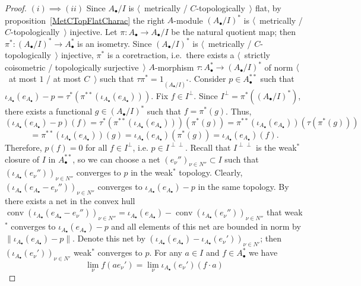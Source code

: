 \begin{proof} $(i)\implies (ii)$  Since $A_\bullet /I$ is $\langle$~metrically
/ $C$-topologically~$\rangle$ flat, by proposition~\ref{MetCTopFlatCharac} 
the right $A$-module ${(A_\bullet /I)}^*$ is $\langle$~metrically /
$C$-topologically~$\rangle$ injective. Let $\pi:A_\bullet \to A_\bullet /I$ be the
natural quotient map; then $\pi^*:{(A_\bullet /I)}^*\to A_\bullet ^*$ is an
isometry. Since ${(A_\bullet /I)}^*$ is $\langle$~metrically /
$C$-topologically~$\rangle$ injective, $\pi^*$ is a coretraction, i.e.\
there exists a $\langle$~strictly coisometric / topologically
surjective~$\rangle$ $A$-morphism $\tau:A_\bullet ^*\to {(A_\bullet /I)}^*$ of
norm $\langle$~at most $1$ / at most $C$~$\rangle$ such that
$\tau\pi^*=1_{{(A_\bullet /I)}^*}$. Consider $p\in A_\bullet ^{**}$ such that
$\iota_{A_\bullet }(e_{A_\bullet })-p
=\tau^*(\pi^{**}(\iota_{A_\bullet }(e_{A_\bullet })))$. 
Fix $f\in I^\perp$. Since $I^\perp=\pi^*({(A_\bullet /I)}^*)$, 
there exists a functional $g\in {(A_\bullet /I)}^*$ such 
that $f=\pi^*(g)$. Thus,
\[
(\iota_{A_\bullet }(e_{A_\bullet })-p)(f)
=\tau^*(\pi^{**}(\iota_{A_\bullet }(e_{A_\bullet })))(\pi^*(g))
=\pi^{**}(\iota_{A_\bullet }(e_{A_\bullet }))(\tau(\pi^*(g)))
\]
\[
=\pi^{**}(\iota_{A_\bullet }(e_{A_\bullet }))(g)
=\iota_{A_\bullet }(e_{A_\bullet })(\pi^*(g))
=\iota_{A_\bullet }(e_{A_\bullet })(f).
\]
Therefore, $p(f)=0$ for all $f\in I^\perp$, i.e. $p\in I^{\perp\perp}$. Recall
that $I^{\perp\perp}$ is the weak${}^*$ closure of $I$ in $A_\bullet ^{**}$, so we can
choose a net ${(e_\nu'')}_{\nu\in N''}\subset I$ such that
${(\iota_{A_\bullet }(e_\nu''))}_{\nu\in N''}$ converges to $p$ in the weak${}^*$ topology.
Clearly, ${(\iota_{A_\bullet }(e_{A_\bullet }-e_\nu''))}_{\nu\in N''}$ converges to
$\iota_{A_\bullet }(e_{A_\bullet })-p$ in the same topology. By
\cite[lemma 1.1]{PosAndApproxIdinBanAlg} there exists a net in the convex hull
$\operatorname{conv}{
    (\iota_{A_\bullet }(e_{A_\bullet }-e_\nu''))
}_{\nu\in N''}
=\iota_{A_\bullet }(e_{A_\bullet })
-\operatorname{conv}{(\iota_{A_\bullet}(e_\nu''))}_{\nu\in N''}$ 
that weak${}^*$ converges to $\iota_{A_\bullet }(e_{A_\bullet })-p$ and 
all elements of this net are bounded in norm 
by $\lVert \iota_{A_\bullet }(e_{A_\bullet})-p\rVert$. Denote this net by 
${(\iota_{A_\bullet }(e_{A_\bullet })-\iota_{A_\bullet }(e_\nu'))}_{\nu\in N'}$; 
then ${(\iota_{A_\bullet }(e_\nu'))}_{\nu\in N'}$ weak${}^*$ converges to $p$. 
For any $a\in I$ and $f\in A_\bullet ^*$ we have
\[
\lim_{\nu}f(ae_\nu')
=\lim_{\nu}\iota_{A_\bullet }(e_\nu')(f\cdot a)
\]
\end{proof}
